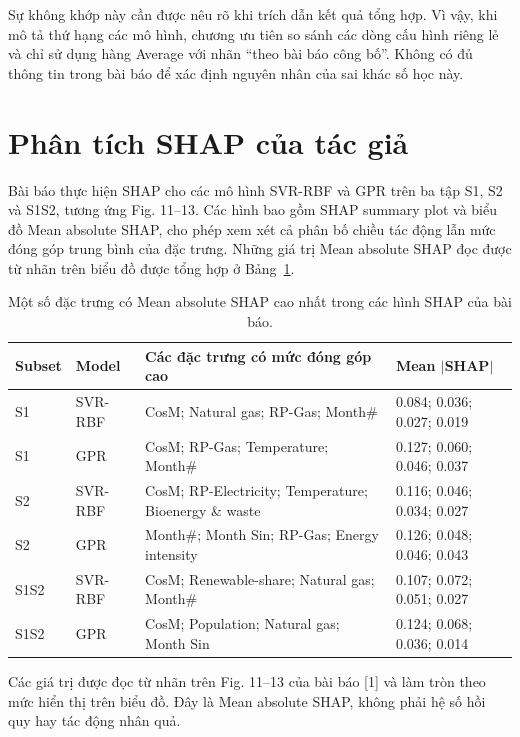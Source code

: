Sự không khớp này cần được nêu rõ khi trích dẫn kết quả tổng hợp. Vì vậy, khi mô tả thứ hạng các mô hình, chương ưu tiên so sánh các dòng cấu hình riêng lẻ và chỉ sử dụng hàng Average với nhãn ``theo bài báo công bố''. Không có đủ thông tin trong bài báo để xác định nguyên nhân của sai khác số học này.

\section{Phân tích SHAP của tác giả}

Bài báo thực hiện SHAP cho các mô hình SVR-RBF và GPR trên ba tập S1, S2 và S1S2, tương ứng Fig. 11--13. Các hình bao gồm SHAP summary plot và biểu đồ Mean absolute SHAP, cho phép xem xét cả phân bố chiều tác động lẫn mức đóng góp trung bình của đặc trưng. Những giá trị Mean absolute SHAP đọc được từ nhãn trên biểu đồ được tổng hợp ở Bảng~\ref{tab:authors-shap-top}.

\begin{table}[H]
\centering
\scriptsize
\caption{Một số đặc trưng có Mean absolute SHAP cao nhất trong các hình SHAP của bài báo.}
\label{tab:authors-shap-top}
\begin{tabular}{llp{6.2cm}p{2.5cm}}
\toprule
\textbf{Subset} & \textbf{Model} & \textbf{Các đặc trưng có mức đóng góp cao} & \textbf{Mean $|$SHAP$|$} \\
\midrule
S1 & SVR-RBF & CosM; Natural gas; RP-Gas; Month\# & 0.084; 0.036; 0.027; 0.019 \\
S1 & GPR & CosM; RP-Gas; Temperature; Month\# & 0.127; 0.060; 0.046; 0.037 \\
S2 & SVR-RBF & CosM; RP-Electricity; Temperature; Bioenergy \& waste & 0.116; 0.046; 0.034; 0.027 \\
S2 & GPR & Month\#; Month Sin; RP-Gas; Energy intensity & 0.126; 0.048; 0.046; 0.043 \\
S1S2 & SVR-RBF & CosM; Renewable-share; Natural gas; Month\# & 0.107; 0.072; 0.051; 0.027 \\
S1S2 & GPR & CosM; Population; Natural gas; Month Sin & 0.124; 0.068; 0.036; 0.014 \\
\bottomrule
\end{tabular}
\par\vspace{1mm}
\parbox{0.96\textwidth}{\footnotesize Các giá trị được đọc từ nhãn trên Fig. 11--13 của bài báo [1] và làm tròn theo mức hiển thị trên biểu đồ. Đây là Mean absolute SHAP, không phải hệ số hồi quy hay tác động nhân quả.}
\end{table}

